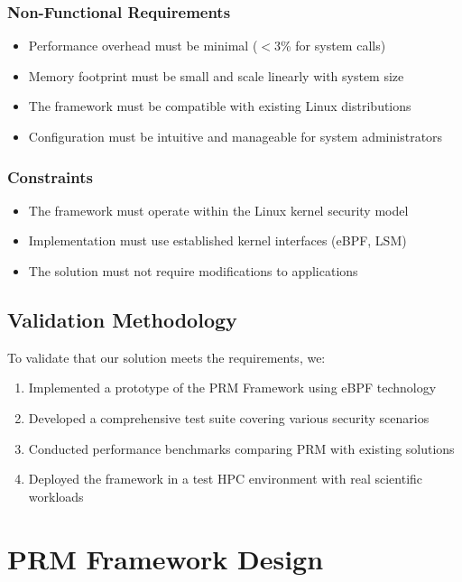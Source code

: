 \documentclass[conference]{IEEEtran}
\begin{document}
\subsubsection{Non-Functional Requirements}
\begin{itemize}
\item Performance overhead must be minimal ($<$3\% for system calls)
\item Memory footprint must be small and scale linearly with system size
\item The framework must be compatible with existing Linux distributions
\item Configuration must be intuitive and manageable for system administrators
\end{itemize}

\subsubsection{Constraints}
\begin{itemize}
\item The framework must operate within the Linux kernel security model
\item Implementation must use established kernel interfaces (eBPF, LSM)
\item The solution must not require modifications to applications
\end{itemize}

\subsection{Validation Methodology}
To validate that our solution meets the requirements, we:

\begin{enumerate}
\item Implemented a prototype of the PRM Framework using eBPF technology
\item Developed a comprehensive test suite covering various security scenarios
\item Conducted performance benchmarks comparing PRM with existing solutions
\item Deployed the framework in a test HPC environment with real scientific workloads
\end{enumerate}

\section{PRM Framework Design}
\label{sec:design}
\end{document}
